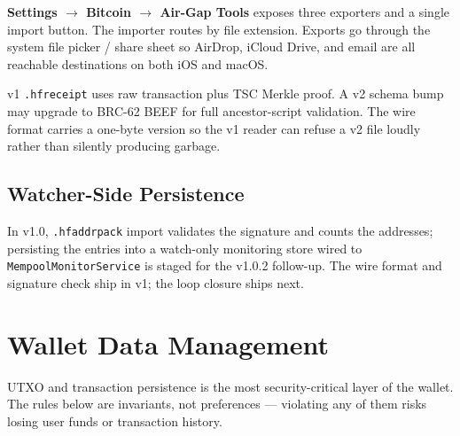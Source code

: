 \documentclass[a4paper, 11pt, openany]{book}
\begin{document}
\textbf{Settings $\rightarrow$ Bitcoin $\rightarrow$ Air-Gap Tools} exposes three exporters and a single import button. The importer routes by file extension. Exports go through the system file picker / share sheet so AirDrop, iCloud Drive, and email are all reachable destinations on both iOS and macOS.

\begin{notebox}
v1 \texttt{.hfreceipt} uses raw transaction plus TSC Merkle proof. A v2 schema bump may upgrade to BRC-62 BEEF for full ancestor-script validation. The wire format carries a one-byte version so the v1 reader can refuse a v2 file loudly rather than silently producing garbage.
\end{notebox}

\subsection{Watcher-Side Persistence}

In v1.0, \texttt{.hfaddrpack} import validates the signature and counts the addresses; persisting the entries into a watch-only monitoring store wired to \texttt{Mempool\-Monitor\-Service} is staged for the v1.0.2 follow-up. The wire format and signature check ship in v1; the loop closure ships next.

\section{Wallet Data Management}

UTXO and transaction persistence is the most security-critical layer of the wallet. The rules below are invariants, not preferences --- violating any of them risks losing user funds or transaction history.
\end{document}
